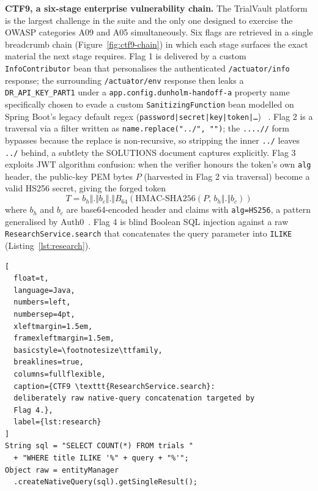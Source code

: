 \textbf{CTF9, a six-stage enterprise vulnerability chain.}
The TrialVault platform is the largest challenge in the
suite and the only one designed to exercise the OWASP
categories A09 and A05 simultaneously. Six flags are
retrieved in a single breadcrumb chain
(Figure~\ref{fig:ctf9-chain}) in which each stage surfaces
the exact material the next stage requires. Flag 1 is
delivered by a custom \texttt{InfoContributor} bean that
personalises the authenticated \texttt{/actuator/info}
response; the surrounding \texttt{/actuator/env} response then leaks a \texttt{DR\_API\_KEY\_PART1} under a
\texttt{app.config.dunholm-handoff-a} property name
specifically chosen to evade a custom
\texttt{SanitizingFunction} bean modelled on Spring Boot's
legacy default regex
(\texttt{password|secret|key|token|\ldots})%
~\cite{SpringActuatorSanitiser}. Flag 2 is a traversal via a
filter written as \texttt{name.replace("../", "")}; the
\texttt{....//} form bypasses because the replace is
non-recursive, so stripping the inner \texttt{../} leaves
\texttt{../} behind, a subtlety the SOLUTIONS document
captures explicitly. Flag
3 exploits JWT algorithm confusion: when the verifier
honours the token's own \texttt{alg} header, the public-key
PEM bytes $P$ (harvested in Flag 2 via traversal) become a
valid HS256 secret, giving the forged token
\begin{equation}
T = b_h \Vert \texttt{.} \Vert b_c \Vert \texttt{.} \Vert
B_{64}\!\left(\mathrm{HMAC\text{-}SHA256}(P,\, b_h \Vert \texttt{.} \Vert b_c)\right)
\label{eq:jwt-confusion}
\end{equation}
where $b_h$ and $b_c$ are base64-encoded header and claims
with \texttt{alg=HS256}, a pattern generalised by
Auth0~\cite{Auth0JWTAttacks}. Flag 4 is blind Boolean SQL
injection against a raw
\texttt{ResearchService.search} that concatenates the query
parameter into \texttt{ILIKE} (Listing~\ref{lst:research}).

\begin{lstlisting}[
  float=t,
  language=Java,
  numbers=left,
  numbersep=4pt,
  xleftmargin=1.5em,
  framexleftmargin=1.5em,
  basicstyle=\footnotesize\ttfamily,
  breaklines=true,
  columns=fullflexible,
  caption={CTF9 \texttt{ResearchService.search}:
  deliberately raw native-query concatenation targeted by
  Flag 4.},
  label={lst:research}
]
String sql = "SELECT COUNT(*) FROM trials "
  + "WHERE title ILIKE '%" + query + "%'";
Object raw = entityManager
  .createNativeQuery(sql).getSingleResult();
\end{lstlisting}

